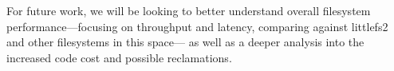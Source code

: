 \documentclass[letterpaper,twocolumn,10pt]{article}
\def\lfs+{littlefs}
\def\lfsiii+{avianfs}
\def\lfsiii+{littlefs3}
\def\lfsii+{littlefs2}
\begin{document}
For future work, we will be looking to better understand overall
filesystem performance---focusing on throughput and latency, comparing 
against \lfsii+ and other filesystems in this space---%
as well as a deeper analysis into the increased code cost and possible
reclamations.



% 
% 
% 
% 
% 
% 
% 
% 
% 
% 
% 
% 
% 
% 
% 











\end{document}
